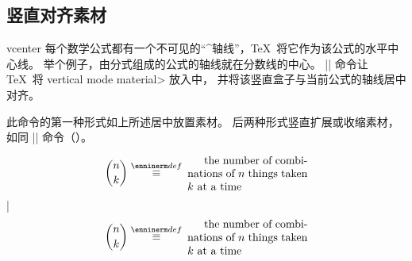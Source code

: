\subsection {竖直对齐素材}

\begindesc
\cts vcenter {}
\explain
每个数学公式都有一个不可见的``^{轴线}''，\TeX\ 将它作为该公式的水平中心线。
举个例子，由分式组成的公式的轴线就在分数线的中心。
|\vcenter| 命令让 \TeX\ 将 \<vertical mode material> 放入中，
并将该竖直盒子与当前公式的轴线居中对齐。

此命令的第一种形式如上所述居中放置素材。
后两种形式竖直扩展或收缩素材，如同 |\vbox| 命令（\xref\vbox ）。

\example
$${n \choose k} \buildrel \rm def \over \equiv \>
\vcenter{\hsize 1.5 in \noindent the number of
combinations of $n$ things taken $k$ at a time}$$
|
\dproduces
$${n \choose k} \buildrel \rm def \over \equiv \>
\vcenter{\hsize 1.5 in \noindent the number of
combinations of $n$ things taken $k$ at a time}$$
\endexample
\enddesc


